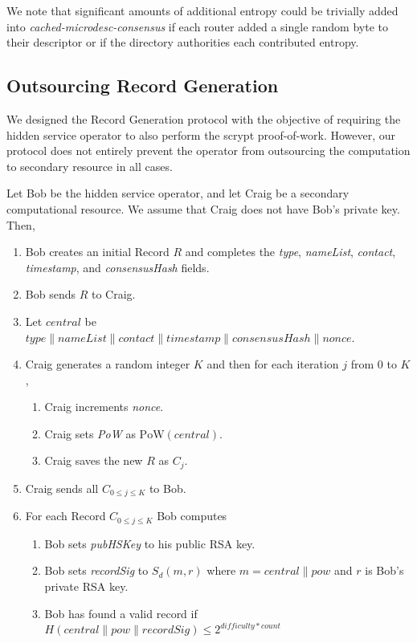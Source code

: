 \documentclass{sig-alternate}
\newcommand*\concat{\mathbin{\|}}
\begin{document}
We note that significant amounts of additional entropy could be trivially added into \emph{cached-microdesc-consensus} if each router added a single random byte to their descriptor or if the directory authorities each contributed entropy.

\subsection{Outsourcing Record Generation}

We designed the Record Generation protocol with the objective of requiring the hidden service operator to also perform the scrypt proof-of-work. However, our protocol does not entirely prevent the operator from outsourcing the computation to secondary resource in all cases.

Let Bob be the hidden service operator, and let Craig be a secondary computational resource. We assume that Craig does not have Bob's private key. Then,

\begin{enumerate}
	\item Bob creates an initial Record $ R $ and completes the \emph{type}, \emph{nameList}, \emph{contact}, \emph{timestamp}, and \emph{consensusHash} fields.
	\item Bob sends $ R $ to Craig.
	\item Let $ \mathit{central} $ be $\mathit{type} \concat \mathit{nameList} \concat \mathit{contact} \concat \mathit{timestamp} \concat \mathit{consensusHash} \concat \mathit{nonce} $.
	\item Craig generates a random integer $ K $ and then for each iteration $ j $ from 0 to $ K $,
		\begin{enumerate}
			\item Craig increments \emph{nonce}.
			\item Craig sets \emph{PoW} as $ \mathrm{PoW}(\mathit{central}) $.
			\item Craig saves the new $ R $ as $ C_{j} $.
		\end{enumerate}
	\item Craig sends all $ C_{0 \le j \le K} $ to Bob.
	\item For each Record $ C_{0 \le j \le K} $ Bob computes
		\begin{enumerate}
			\item Bob sets \emph{pubHSKey} to his public RSA key.
			\item Bob sets \emph{recordSig} to $ S_{d}(m, r) $ where $ m = \mathit{central} \concat \mathit{pow} $ and $ r $ is Bob's private RSA key.
			\item Bob has found a valid record if $ H(\mathit{central} \concat \mathit{pow} \concat \mathit{recordSig}) \leq 2^{\mathit{difficulty} * \mathit{count}} $
		\end{enumerate}
\end{enumerate}
\end{document}
